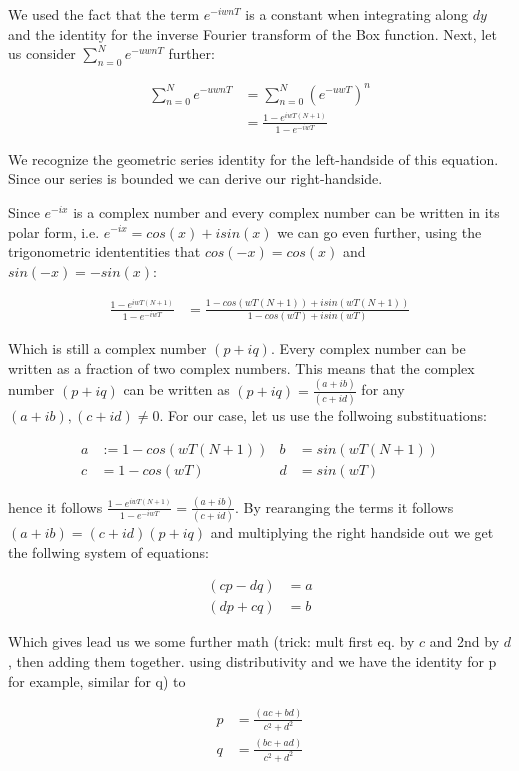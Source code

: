 We used the fact that the term $e^{-iwnT}$ is a constant when integrating along $dy$ and the identity for the inverse Fourier transform of the Box function. Next, let us consider $\sum_{n=0}^N e^{-uwnT}$ further:

\begin{align*}
\sum_{n=0}^N e^{-uwnT}
& =\sum_{n=0}^N (e^{-uwT})^n \\
& =\frac{1-e^{iwT(N+1)}}{1-e^{-iwT}}
\end{align*}

We recognize the geometric series identity for the left-handside of this equation. Since our series is bounded we can derive our right-handside.

Since $e^{-ix}$ is a complex number and every complex number can be written in its polar form, i.e. $e^{-ix} = cos(x) + i sin(x)$ we can go even further, using the trigonometric idententities that $cos(-x) = cos(x)$ and $sin(-x) = -sin(x)$:

\begin{align*}
\frac{1-e^{iwT(N+1)}}{1-e^{-iwT}}
& =\frac{1-cos(wT(N+1)) + i sin(wT(N+1)) }{1-cos(wT) + i sin(wT)}
\end{align*}

Which is still a complex number $(p+iq)$. Every complex number can be written as a fraction of two complex numbers. This means that the complex number $(p+iq)$ can be written as $(p+iq) = \frac{(a+ib)}{(c+id)}$ for any $(a+ib), (c+id) \neq 0$. 
For our case, let us use the follwoing substituations: 

\begin{align}
a& := 1 - cos(wT(N+1))&
b& =sin(wT(N+1))\\
c& =1-cos(wT)&
d& =sin(wT)
\end{align}

hence it follows $\frac{1-e^{iwT(N+1)}}{1-e^{-iwT}} = \frac{(a+ib)}{(c+id)}$.
By rearanging the terms it follows $(a+ib) = (c+id)(p+iq)$ and multiplying the right handside out we get the follwing system of equations:

\begin{align}
(cp-dq)& =a\\
(dp + cq)& =b
\end{align}

Which gives lead us we some further math (trick: mult first eq. by $c$ and 2nd by $d$, then adding them together. using distributivity and we have the identity for p for example, similar for q) to 

\begin{align}
p& =\frac{(ac+bd)}{c^2 + d^2}\\
q& =\frac{(bc+ad)}{c^2 + d^2}
\end{align}


